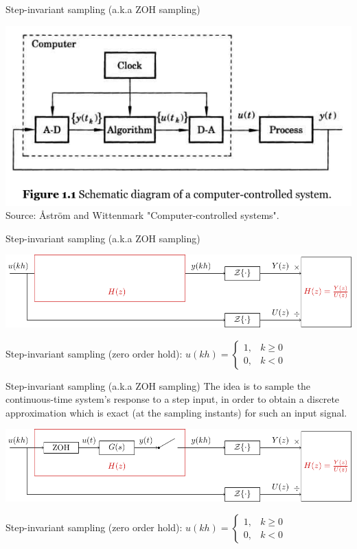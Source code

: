 \documentclass[presentation,aspectratio=169]{beamer}
\begin{document}
\begin{frame}[label={sec:orgcc284a9}]{Step-invariant sampling (a.k.a ZOH sampling)}
\begin{center}
\includegraphics[width=0.6\linewidth]{../../figures/fig1-1-schematic.png} Source: Åström and Wittenmark "Computer-controlled systems".
\end{center}
\end{frame}

\begin{frame}[label={sec:org96db9df}]{Step-invariant sampling (a.k.a ZOH sampling)}
\begin{center}
\includegraphics[width=0.9\linewidth]{../../figures/invariant-sampling-white.pdf}
\end{center}

\pause
Step-invariant sampling (zero order hold): \(u(kh) = \begin{cases} 1, & k \ge 0\\0, & k<0 \end{cases}\)
\end{frame}

\begin{frame}[label={sec:org118eb6f}]{Step-invariant sampling (a.k.a ZOH sampling)}
The idea is to sample the continuous-time system's response to a step input, in order to obtain a discrete approximation which is \alert{exact} (at the sampling instants) for such an input signal. 

\begin{center}
\includegraphics[width=0.9\linewidth]{../../figures/invariant-sampling.pdf}
\end{center}

Step-invariant sampling (zero order hold): \(u(kh) = \begin{cases} 1, & k \ge 0\\0, & k<0 \end{cases}\)
\end{frame}
\end{document}
